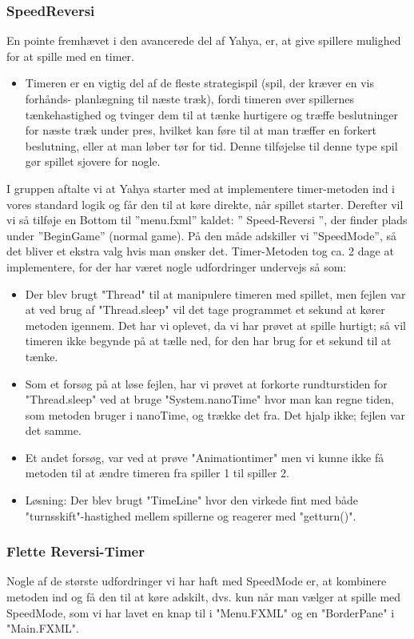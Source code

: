 \subsubsection{SpeedReversi}\label{SR}
En pointe fremhævet i den avancerede del af Yahya, er, at give spillere mulighed for at spille med en timer.
\begin{itemize}
\item Timeren er en vigtig del af de fleste strategispil (spil, der kræver en vis forhånds- planlægning til næste træk), fordi timeren øver spillernes tænkehastighed og tvinger dem til at tænke hurtigere og træffe beslutninger for næste træk under pres, hvilket kan føre til at man træffer en forkert beslutning, eller at man løber tør for tid. Denne tilføjelse til denne type spil gør spillet sjovere for nogle. 
\end{itemize}
I gruppen aftalte vi at Yahya starter med at implementere timer-metoden ind i vores standard logik og får den til at køre direkte, når spillet starter. Derefter vil vi så tilføje en Bottom til ”menu.fxml” kaldet: ” Speed-Reversi ”, der finder plads under ”BeginGame” (normal game).
På den måde adskiller vi ”SpeedMode”, så det bliver et ekstra valg hvis man ønsker det. 
Timer-Metoden tog ca. 2 dage at implementere, for der har været nogle udfordringer undervejs så som: 
\begin{itemize}
\item Der blev brugt "Thread" til at manipulere timeren med spillet, men fejlen var at ved brug af "Thread.sleep" vil det tage programmet et sekund at kører metoden igennem. Det har vi oplevet, da vi har prøvet at spille hurtigt; så vil timeren ikke begynde på at tælle ned, for den har brug for et sekund til at tænke. 
\item Som et forsøg på at løse fejlen, har vi prøvet at forkorte rundturstiden for "Thread.sleep" ved at bruge "System.nanoTime" hvor man kan regne tiden, som metoden bruger i nanoTime, og trække det fra. Det hjalp ikke; fejlen var det samme. 
\item Et andet forsøg, var ved at prøve "Animationtimer" men vi kunne ikke få metoden til at ændre timeren fra spiller 1 til spiller 2. 
\item Løsning: 
Der blev brugt "TimeLine" hvor den virkede fint med både "turnsskift"-hastighed mellem spillerne og reagerer med "getturn()". 
\end{itemize}
\subsubsection{Flette Reversi-Timer}\label{FRT}
Nogle af de største udfordringer vi har haft med SpeedMode er, at kombinere metoden ind og få den til at køre adskilt, dvs. kun når man vælger at spille med SpeedMode, som vi har lavet en knap til i "Menu.FXML" og en "BorderPane" i "Main.FXML".
